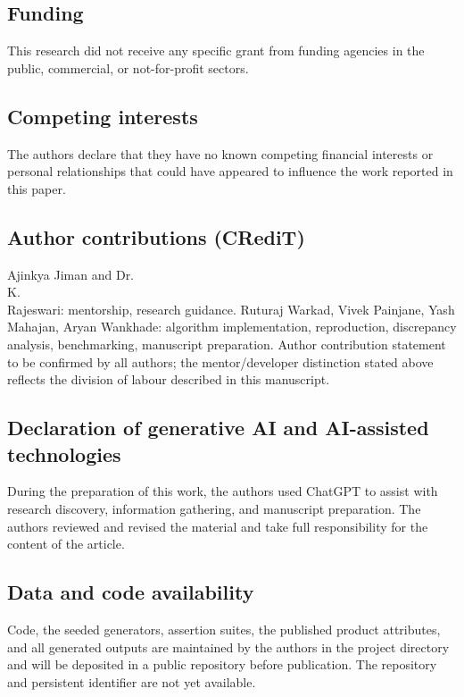 \documentclass[12pt]{article}
\begin{document}
\subsection{Funding}
This research did not receive any specific grant from funding agencies in the public, commercial, or not-for-profit sectors.

\subsection{Competing interests}
The authors declare that they have no known competing financial interests or personal relationships that could have appeared to influence the work reported in this paper.

\subsection{Author contributions (CRediT)}
Ajinkya Jiman and Dr.\\ K.\\ Rajeswari: mentorship, research guidance. Ruturaj Warkad, Vivek Painjane, Yash Mahajan, Aryan Wankhade: algorithm implementation, reproduction, discrepancy analysis, benchmarking, manuscript preparation. Author contribution statement to be confirmed by all authors; the mentor/developer distinction stated above reflects the division of labour described in this manuscript.

\subsection{Declaration of generative AI and AI-assisted technologies}
During the preparation of this work, the authors used ChatGPT to assist with research discovery, information gathering, and manuscript preparation. The authors reviewed and revised the material and take full responsibility for the content of the article.

\subsection{Data and code availability}
Code, the seeded generators, assertion suites, the published product attributes, and all generated outputs are maintained by the authors in the project directory and will be deposited in a public repository before publication. The repository and persistent identifier are not yet available.



\end{document}
